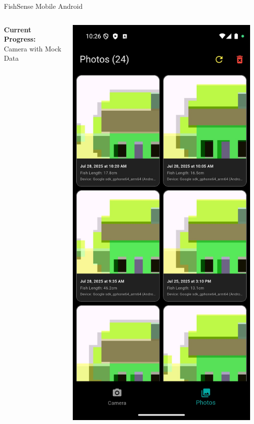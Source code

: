 \begin{frame}{FishSense Mobile Android}
\begin{columns}
\begin{column}{0.32\textwidth}
            \vspace{0.2cm}
            \textbf{Current Progress:} \\
            Camera with Mock Data
        \end{column}
        
        \begin{column}{0.32\textwidth}
            \centering
            \includegraphics[height=0.8\textheight,keepaspectratio]{images/GalleryImage.jpg}
            

\end{column}
\end{columns}
\end{frame}

